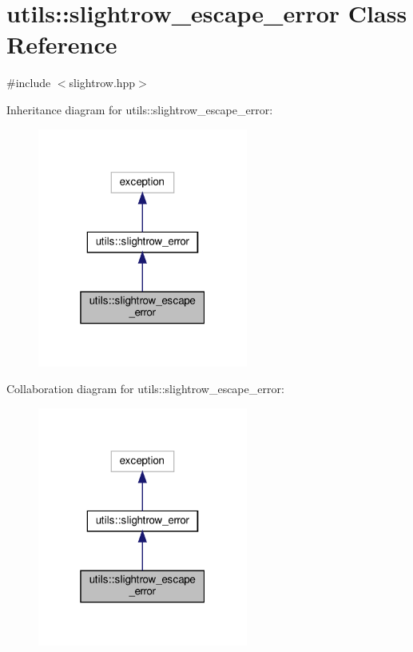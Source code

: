 \hypertarget{classutils_1_1slightrow__escape__error}{}\section{utils\+:\+:slightrow\+\_\+escape\+\_\+error Class Reference}
\label{classutils_1_1slightrow__escape__error}


{\ttfamily \#include $<$slightrow.\+hpp$>$}



Inheritance diagram for utils\+:\+:slightrow\+\_\+escape\+\_\+error\+:
\nopagebreak
\begin{figure}[H]
\begin{center}
\leavevmode
\includegraphics[width=196pt]{classutils_1_1slightrow__escape__error__inherit__graph}
\end{center}
\end{figure}


Collaboration diagram for utils\+:\+:slightrow\+\_\+escape\+\_\+error\+:
\nopagebreak
\begin{figure}[H]
\begin{center}
\leavevmode
\includegraphics[width=196pt]{classutils_1_1slightrow__escape__error__coll__graph}
\end{center}
\end{figure}


